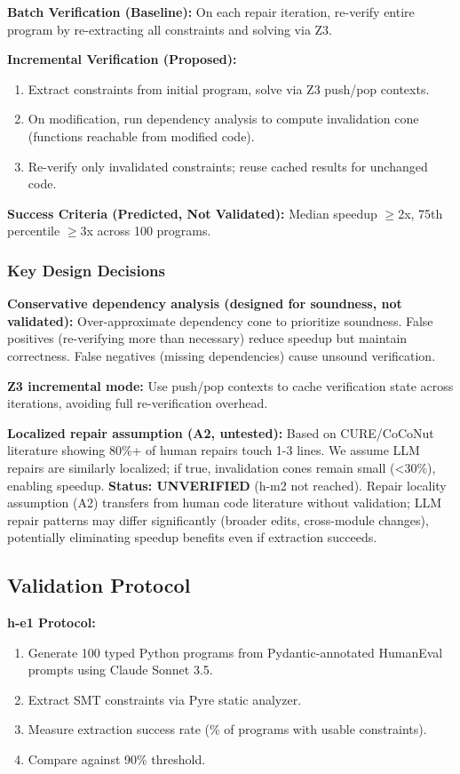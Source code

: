 \textbf{Batch Verification (Baseline):} On each repair iteration, re-verify entire program by re-extracting all constraints and solving via Z3.

\textbf{Incremental Verification (Proposed):}
\begin{enumerate}
\item Extract constraints from initial program, solve via Z3 push/pop contexts.
\item On modification, run dependency analysis to compute invalidation cone (functions reachable from modified code).
\item Re-verify only invalidated constraints; reuse cached results for unchanged code.
\end{enumerate}

\textbf{Success Criteria (Predicted, Not Validated):} Median speedup $\geq$2x, 75th percentile $\geq$3x across 100 programs.

\subsubsection{Key Design Decisions}

\textbf{Conservative dependency analysis (designed for soundness, not validated):} Over-approximate dependency cone to prioritize soundness. False positives (re-verifying more than necessary) reduce speedup but maintain correctness. False negatives (missing dependencies) cause unsound verification.

\textbf{Z3 incremental mode:} Use push/pop contexts to cache verification state across iterations, avoiding full re-verification overhead.

\textbf{Localized repair assumption (A2, untested):} Based on CURE/CoCoNut literature showing 80\%+ of human repairs touch 1-3 lines. We assume LLM repairs are similarly localized; if true, invalidation cones remain small (<30\%), enabling speedup. \textbf{Status: UNVERIFIED} (h-m2 not reached). Repair locality assumption (A2) transfers from human code literature without validation; LLM repair patterns may differ significantly (broader edits, cross-module changes), potentially eliminating speedup benefits even if extraction succeeds.

\subsection{Validation Protocol}

\textbf{h-e1 Protocol:}
\begin{enumerate}
\item Generate 100 typed Python programs from Pydantic-annotated HumanEval prompts using Claude Sonnet 3.5.
\item Extract SMT constraints via Pyre static analyzer.
\item Measure extraction success rate (\% of programs with usable constraints).
\item Compare against 90\% threshold.
\end{enumerate}

